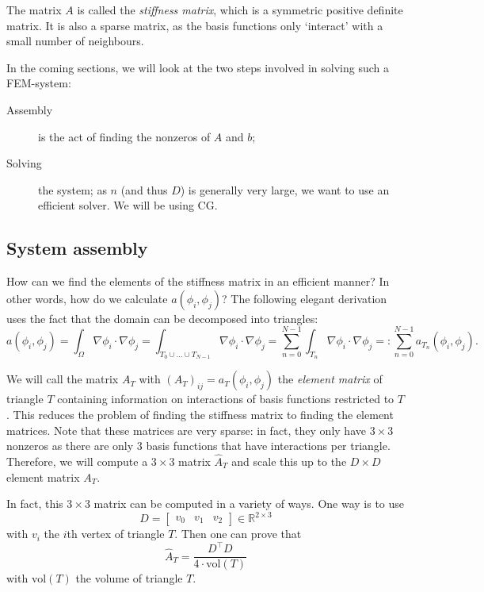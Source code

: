 \documentclass[11pt]{amsart}
\theoremstyle{definition}
\newcommand{\R}{\mathbb{R}}
\begin{document}
The matrix $A$ is called the \emph{stiffness matrix}, which is \cite{TODORAYMOND} a symmetric positive definite matrix. It is also a sparse matrix, as the basis functions only `interact' with a small number of neighbours.

In the coming sections, we will look at the two steps involved in solving such a FEM-system:
\begin{description}
  \item[Assembly] is the act of finding the nonzeros of $A$ and $b$;
  \item[Solving] the system; as $n$ (and thus $D$) is generally very large, we want to use an efficient solver. We will be using CG.
\end{description}

\subsection{System assembly}
How can we find the elements of the stiffness matrix in an efficient manner? In other words, how do we calculate $a(\phi_i, \phi_j)$? The following elegant derivation uses the fact that the domain can be decomposed into triangles:
\begin{equation}
  \label{eqn:div}
	a(\phi_i, \phi_j) = \int_\Omega \nabla \phi_i \cdot \nabla \phi_j = \int_{T_0 \cup \dots \cup T_{N-1}} \nabla \phi_i \cdot \nabla \phi_j = \sum_{n = 0}^{N-1} \int_{T_n} \nabla \phi_i \cdot \nabla \phi_j =: \sum_{n=0}^{N-1}a_{T_n}(\phi_i, \phi_j).
\end{equation}

We will call the matrix $A_T$ with $(A_T)_{ij} = a_T(\phi_i, \phi_j)$ the \emph{element matrix} of triangle $T$ containing information on interactions of basis functions restricted to $T$. This reduces the problem of finding the stiffness matrix to finding the element matrices. Note that these matrices are very sparse: in fact, they only have $3 \times 3$ nonzeros as there are only 3 basis functions that have interactions per triangle. Therefore, we will compute a $3 \times 3$ matrix $\hat A_T$ and scale this up to the $D \times D$ element matrix $A_T$.


In fact, this $3 \times 3$ matrix can be computed in a variety of ways. One way is to use
\[
  D = \begin{bmatrix} v_{0} & v_{1} & v_{2} \end{bmatrix} \in \R^{ 2 \times 3}
\]
with $v_{i}$ the $i$th vertex of triangle $T$. Then one can prove \cite{TODO} that
\[
  \hat A_T = \frac{D^\top D}{4 \cdot \text{vol}(T)}
\]
with $\text{vol}(T)$ the volume of triangle $T$.
\end{document}

